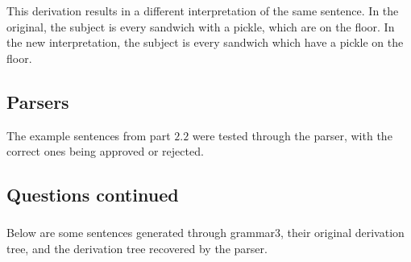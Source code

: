 \documentclass[11pt]{article}
\begin{document}
This derivation results in a different interpretation of the same sentence. In the original, the subject is every sandwich with a pickle, which are on the floor. In the new interpretation, the subject is every sandwich which have a pickle on the floor.

\subsection{Parsers}

The example sentences from part $2.2$ were tested through the parser, with the correct ones being approved or rejected.

\subsection{Questions continued}

\subsubsection{}

Below are some sentences generated through grammar3, their original derivation tree, and the derivation tree recovered by the parser.
\end{document}
